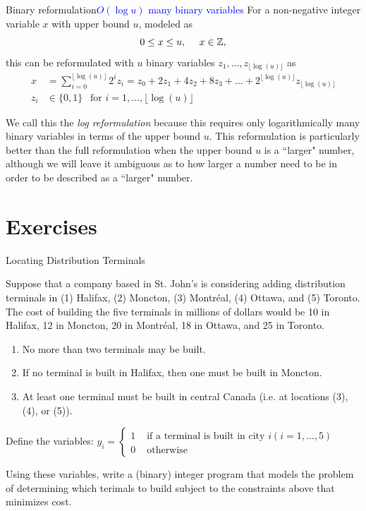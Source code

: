 \begin{general}{Binary reformulation}{\textcolor{blue}{$O(\log u)$ many binary variables}}
\label{general:log-reformulation}
For a non-negative integer variable $x$ with upper bound $u$, modeled as 
\begin{equation}
0 \leq x \leq u, \ \ \ \ x \in \mathbb{Z},
\end{equation}
this can be reformulated with $u$ binary variables $z_1, \dots, z_{\lfloor\log( u )\rfloor}$ as 
\begin{equation}
\begin{split}
x & = \sum_{i=0}^{\lfloor\log( u )\rfloor}2^i z_i = z_0 + 2 z_1 +  4 z_2 + 8 z_3 + \dots + 2^{\lfloor\log( u )\rfloor} z_{\lfloor\log( u )\rfloor}\\
z_i & \in \{0,1\} \ \ \text{ for } i=1, \dots, \lfloor\log( u )\rfloor
\end{split}
\end{equation}
\end{general}
We call this the \emph{log reformulation} because this requires only logarithmically many binary variables in terms of the upper bound $u$.   This reformulation is particularly better than the full reformulation when the upper bound $u$ is a ``larger" number, although we will leave it ambiguous as to how larger a number need to be in order to be described as a ``larger" number. 

\section{Exercises}
\begin{ex}{Locating Distribution Terminals}{}{}

Suppose that a company based in St. John's is considering adding distribution terminals in (1) Halifax, (2) Moncton, (3) Montréal, (4) Ottawa, and (5) Toronto.\\

The cost of building the five terminals in millions of dollars would be 10 in Halifax, 12 in Moncton, 20 in Montréal, 18 in Ottawa, and 25 in Toronto. 
\begin{enumerate}
\item No more than two terminals may be built. 
\item If no terminal is built in Halifax, then one must be built in Moncton. 
\item At least one terminal must be built in central Canada (i.e. at locations (3), (4), or (5)).
\end{enumerate}

Define the variables:
$y_{i}= \begin{cases}1 & \text { if a terminal is built in city } i(i=1, \ldots, 5) \\ 0 & \text { otherwise }\end{cases}$

Using these variables, write a (binary) integer program that models the problem of determining which terimals to build subject to the constraints above that minimizes cost.
\end{ex}

